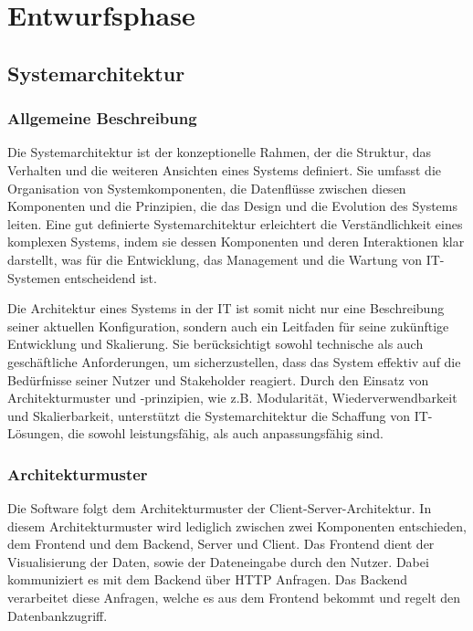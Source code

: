 \section{Entwurfsphase}

\subsection{Systemarchitektur}

\subsubsection{Allgemeine Beschreibung}

Die Systemarchitektur ist der konzeptionelle Rahmen, der die Struktur, das Verhalten und die weiteren Ansichten eines Systems definiert.
Sie umfasst die Organisation von Systemkomponenten, die Datenflüsse zwischen diesen Komponenten und die Prinzipien, die das Design und
die Evolution des Systems leiten. Eine gut definierte Systemarchitektur erleichtert die Verständlichkeit eines komplexen Systems, indem
sie dessen Komponenten und deren Interaktionen klar darstellt, was für die Entwicklung, das Management und die Wartung von IT-Systemen
entscheidend ist.

Die Architektur eines Systems in der IT ist somit nicht nur eine Beschreibung seiner aktuellen Konfiguration, sondern auch ein Leitfaden für
seine zukünftige Entwicklung und Skalierung. Sie berücksichtigt sowohl technische als auch geschäftliche Anforderungen, um sicherzustellen,
dass das System effektiv auf die Bedürfnisse seiner Nutzer und Stakeholder reagiert. Durch den Einsatz von Architekturmuster und -prinzipien,
wie z.B. Modularität, Wiederverwendbarkeit und Skalierbarkeit, unterstützt die Systemarchitektur die Schaffung von IT-Lösungen, die sowohl
leistungsfähig, als auch anpassungsfähig sind.

\subsubsection{Architekturmuster}

Die Software folgt dem Architekturmuster der Client-Server-Architektur. In diesem Architekturmuster wird lediglich zwischen zwei Komponenten
entschieden, dem Frontend und dem Backend, Server und Client. Das Frontend dient der Visualisierung der Daten, sowie der Dateneingabe durch den
Nutzer. Dabei kommuniziert es mit dem Backend über HTTP Anfragen. Das Backend verarbeitet diese Anfragen, welche es aus dem Frontend bekommt
und regelt den Datenbankzugriff.

